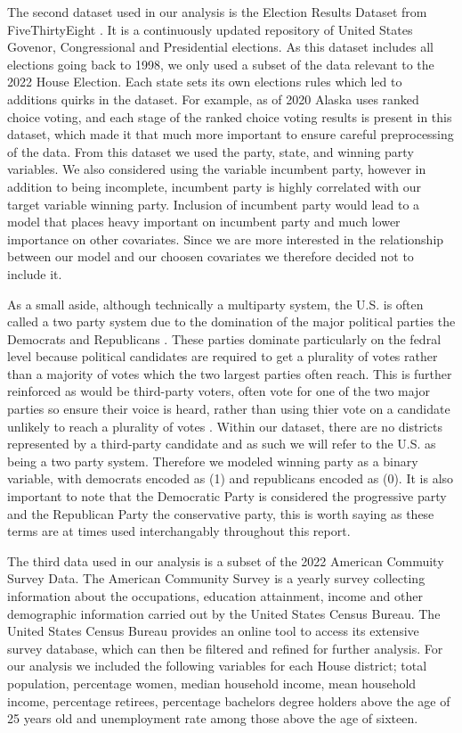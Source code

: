 \documentclass[12pt]{article}
\begin{document}
The second dataset used in our analysis is the Election Results Dataset from FiveThirtyEight \cite{electionresultsdataset}. It is a continuously updated repository of United States Govenor, Congressional and Presidential elections. 
As this dataset includes all elections going back to 1998, we only used a subset of the data relevant to the 2022 House Election. Each state sets its own elections rules which led to additions quirks in the dataset. For example, as of 2020 Alaska uses ranked choice voting, and each stage of the ranked choice voting results is present in this dataset, which made it that much more important to ensure careful preprocessing of the data. From this dataset we used the party, state, and winning party variables. 
We also considered using the variable incumbent party, however in addition to being incomplete, incumbent party is highly correlated with our target variable winning party. Inclusion of incumbent party would lead to a model that places heavy important on incumbent party and much lower importance on other covariates. Since we are more interested in the relationship between our model and our choosen covariates we therefore decided not to include it.  
 
As a small aside, although technically a multiparty system, the U.S. is often called a two party system due to the domination of the major political parties the Democrats and Republicans \parencite{us_elections}. These parties dominate particularly on the fedral level because political candidates are required to get a plurality of votes rather than a majority of votes which the two largest parties often reach. This is further reinforced as would be third-party voters, often vote for one of the two major parties so ensure their voice is heard, rather than using thier vote on a candidate unlikely to reach a plurality of votes \parencite{us_elections}. Within our dataset, there are no districts represented by a third-party candidate and as such we will refer to the U.S. as being a two party system. Therefore we modeled winning party as a binary variable, with democrats encoded as (1) and republicans encoded as (0). It is also important to note that the Democratic Party is considered the progressive party and the Republican Party the conservative party, this is worth saying as 
these terms are at times used interchangably throughout this report. 

The third data used in our analysis is a subset of the 2022 American Commuity Survey Data. The American Community Survey is a yearly survey collecting information about the occupations, education attainment, income and other demographic information carried out by the United States Census Bureau. The United States Census Bureau provides an online tool to access its extensive survey database, which can then be filtered and refined for further analysis. For our analysis we included the following variables for each House district; total population, percentage women, median household income, mean household income, percentage retirees, percentage bachelors degree holders above the age of 25 years old and unemployment rate among those above the age of sixteen. 
\end{document}
